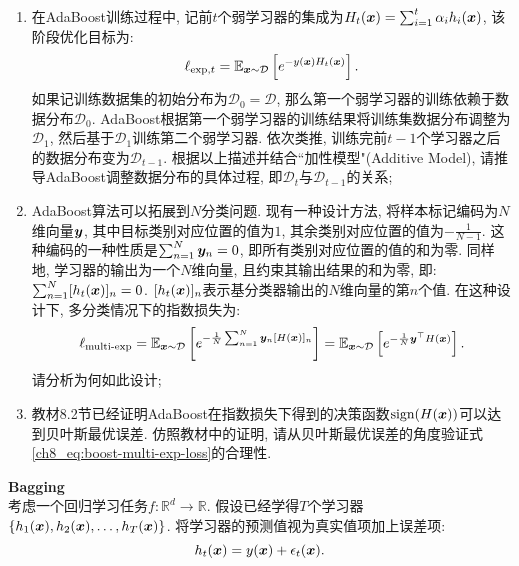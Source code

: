 \documentclass[answers]{exam}  %
\begin{document}
\begin{questions}
\begin{enumerate}
    \item  在AdaBoost训练过程中, 记前$t$个弱学习器的集成为$H_t({\boldsymbol{x}}) = \sum_{i=1}^t \alpha_i h_i({\boldsymbol{x}})$, 该阶段优化目标为: 
    \begin{equation}
        \ell_{\text{exp},t} = \mathbb{E}_{{\boldsymbol{x}} \sim \mathcal{D}}\left[ e^{-y({\boldsymbol{x}})H_t({\boldsymbol{x}})} \right]. \label{ch8_eq:boost-exp-loss}
    \end{equation}
    如果记训练数据集的初始分布为$\mathcal{D}_0=\mathcal{D}$, 那么第一个弱学习器的训练依赖于数据分布$\mathcal{D}_0$. AdaBoost根据第一个弱学习器的训练结果将训练集数据分布调整为$\mathcal{D}_1$, 然后基于$\mathcal{D}_1$训练第二个弱学习器. 依次类推, 训练完前$t-1$个学习器之后的数据分布变为$\mathcal{D}_{t-1}$. 根据以上描述并结合``加性模型"(Additive Model), 请推导AdaBoost调整数据分布的具体过程, 即$\mathcal{D}_t$与$\mathcal{D}_{t-1}$的关系; 
    \item AdaBoost算法可以拓展到$N$分类问题. 现有一种设计方法, 将样本标记编码为$N$维向量$\boldsymbol{y}$, 其中目标类别对应位置的值为$1$, 其余类别对应位置的值为$-\frac{1}{N-1}$. 这种编码的一种性质是$\sum_{n=1}^N \boldsymbol{y}_n = 0$, 即所有类别对应位置的值的和为零. 同样地, 学习器的输出为一个$N$维向量, 且约束其输出结果的和为零, 即: $\sum_{n=1}^N [h_t({\boldsymbol{x}})]_n = 0$. $[h_t({\boldsymbol{x}})]_{n}$表示基分类器输出的$N$维向量的第$n$个值. 在这种设计下, 多分类情况下的指数损失为: 
    \begin{equation}
        \ell_{\text{multi-exp}} = \mathbb{E}_{{\boldsymbol{x}} \sim \mathcal{D}}\left[  e^{-\frac{1}{N}\sum_{n=1}^N \boldsymbol{y}_n [H({\boldsymbol{x}})]_n} \right] = \mathbb{E}_{{\boldsymbol{x}} \sim \mathcal{D}}\left[  e^{- \frac{1}{N} \boldsymbol{y}^\top H({\boldsymbol{x}})} \right]. \label{ch8_eq:boost-multi-exp-loss}
    \end{equation}
    请分析为何如此设计;
    \item 教材8.2节已经证明AdaBoost在指数损失下得到的决策函数$\text{sign}(H({\boldsymbol{x}}))$可以达到贝叶斯最优误差. 仿照教材中的证明, 请从贝叶斯最优误差的角度验证式\eqref{ch8_eq:boost-multi-exp-loss}的合理性.
\end{enumerate}

\begin{solution}
\end{solution}

\question [20] \textbf{Bagging} \\
考虑一个回归学习任务$f:\mathbb{R}^d \rightarrow \mathbb{R}$. 假设已经学得$T$个学习器$\{h_1({\boldsymbol{x}}), h_2({\boldsymbol{x}}), \dots, h_T({\boldsymbol{x}})\}$. 将学习器的预测值视为真实值项加上误差项:
\begin{equation}
h_t({\boldsymbol{x}})=y({\boldsymbol{x}})+\epsilon_t({\boldsymbol{x}}).
\end{equation}


\end{questions}
\end{document}
